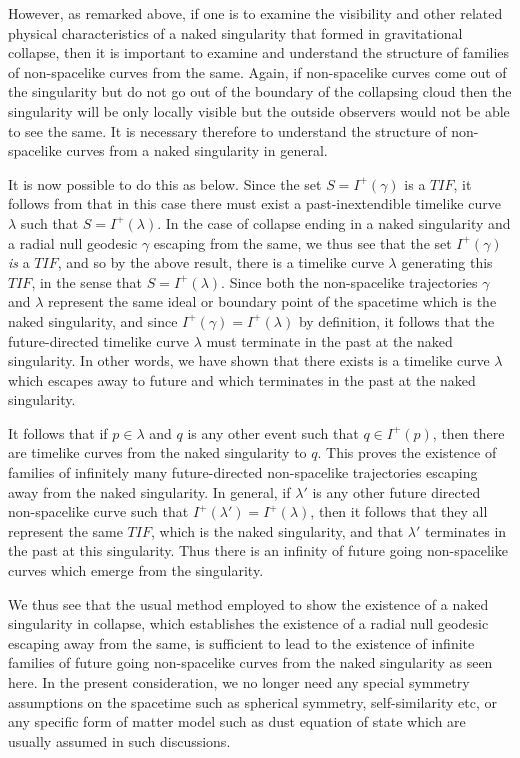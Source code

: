 \documentclass[twocolumn,aps,amsmath,amssymb,prl,showpacs,preprintnumbers]
{revtex4}
\begin{document}
However, as remarked above, if one is to examine 
the visibility and other related physical characteristics 
of a naked singularity that formed in gravitational collapse, 
then it is important to examine and understand the structure 
of families of non-spacelike curves from 
the same.  Again, if non-spacelike curves come out of the singularity 
but do not go out of the boundary of the collapsing cloud then the 
singularity will be only locally visible but the outside 
observers would not be able to see the same. It is necessary 
therefore to understand the structure of non-spacelike curves 
from a naked singularity in general. 


It is now possible to do this as below.
Since the set $S = I^{+}(\gamma)$ is a $TIF$, 
it follows from 
\cite{geroch}
that in this case there must exist a past-inextendible 
timelike curve $\lambda$ such that $S = I^{+}(\lambda)$.  In the 
case of collapse ending in a naked singularity and a radial 
null geodesic $\gamma$ escaping from the same, we thus see 
that the set $I^{+}(\gamma)$ {\it is} a $TIF$, and so 
by the above result, there is a  timelike curve $\lambda$ generating
this $TIF$, in the sense that $S = I^{+}(\lambda)$. Since both the 
non-spacelike trajectories $\gamma$ and $\lambda$ represent the 
same ideal or boundary point of the spacetime which is the naked singularity, 
and since $I^{+}(\gamma) =  I^{+}(\lambda)$ by definition, it follows that
the future-directed timelike curve $\lambda$ must terminate in the 
past at the naked singularity. In other words, we have shown
that there exists is a timelike curve $\lambda$ which escapes away
to future and which terminates in the past at the naked singularity. 


It follows that if $p \in \lambda$ and $q$ is any 
other event such that $q \in I^{+}(p)$, then there are 
timelike curves from the naked singularity to $q$. This proves the 
existence of families of infinitely many future-directed non-spacelike 
trajectories escaping away from the naked singularity.   
In general, if $\lambda'$ is any other future directed 
non-spacelike curve such that
$I^{+}(\lambda') = I^{+}(\lambda)$, then it follows that they
all represent the same $TIF$, which is the naked singularity, and
that $\lambda'$ terminates in the past at this singularity.
Thus there is an infinity of future going non-spacelike curves
which emerge from the singularity.
 

We thus see that the usual method employed to show 
the existence of a naked singularity in collapse, which establishes 
the existence of a radial null geodesic escaping away from the 
same, is sufficient to lead to the existence of infinite families of 
future going non-spacelike curves from the naked singularity 
as seen here. In the present consideration, we no longer need any 
special symmetry assumptions on the spacetime such as spherical symmetry, 
self-similarity etc, or any specific form of matter model such 
as dust equation of state which are usually assumed in such 
discussions. 
\end{document}
